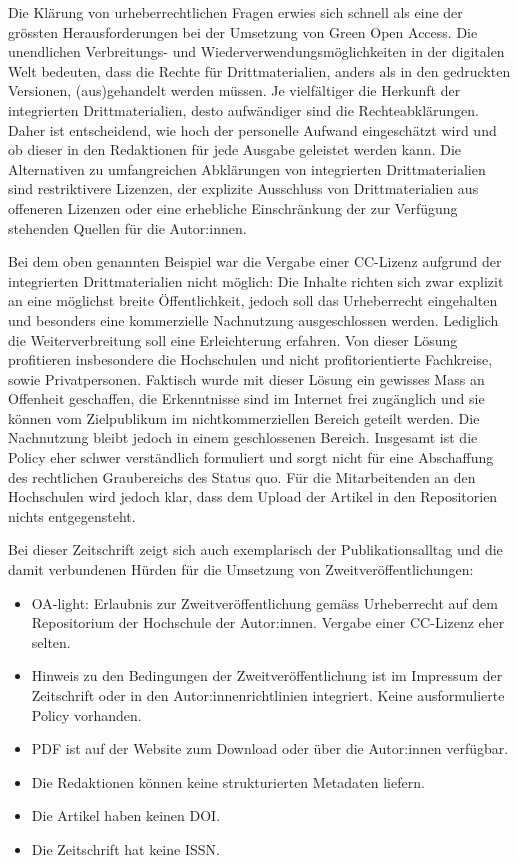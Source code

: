 \documentclass[a4paper,
fontsize=11pt,
oneside,
numbers=noperiodatend,
parskip=half-,
bibliography=totoc,
final
]{scrartcl}
\begin{document}
Die Klärung von urheberrechtlichen Fragen erwies sich schnell als eine
der grössten Herausforderungen bei der Umsetzung von Green Open Access.
Die unendlichen Verbreitungs- und Wiederverwendungsmöglichkeiten in der
digitalen Welt bedeuten, dass die Rechte für Drittmaterialien, anders
als in den gedruckten Versionen, (aus)gehandelt werden müssen. Je
vielfältiger die Herkunft der integrierten Drittmaterialien, desto
aufwändiger sind die Rechteabklärungen. Daher ist entscheidend, wie hoch
der personelle Aufwand eingeschätzt wird und ob dieser in den
Redaktionen für jede Ausgabe geleistet werden kann. Die Alternativen zu
umfangreichen Abklärungen von integrierten Drittmaterialien sind
restriktivere Lizenzen, der explizite Ausschluss von Drittmaterialien
aus offeneren Lizenzen oder eine erhebliche Einschränkung der zur
Verfügung stehenden Quellen für die Autor:innen.

Bei dem oben genannten Beispiel war die Vergabe einer CC-Lizenz aufgrund
der integrierten Drittmaterialien nicht möglich: Die Inhalte richten
sich zwar explizit an eine möglichst breite Öffentlichkeit, jedoch soll
das Urheberrecht eingehalten und besonders eine kommerzielle Nachnutzung
ausgeschlossen werden. Lediglich die Weiterverbreitung soll eine
Erleichterung erfahren. Von dieser Lösung profitieren insbesondere die
Hochschulen und nicht profitorientierte Fachkreise, sowie
Privatpersonen. Faktisch wurde mit dieser Lösung ein gewisses Mass an
Offenheit geschaffen, die Erkenntnisse sind im Internet frei zugänglich
und sie können vom Zielpublikum im nichtkommerziellen Bereich geteilt
werden. Die Nachnutzung bleibt jedoch in einem geschlossenen Bereich.
Insgesamt ist die Policy eher schwer verständlich formuliert und sorgt
nicht für eine Abschaffung des rechtlichen Graubereichs des Status quo.
Für die Mitarbeitenden an den Hochschulen wird jedoch klar, dass dem
Upload der Artikel in den Repositorien nichts entgegensteht.

Bei dieser Zeitschrift zeigt sich auch exemplarisch der
Publikationsalltag und die damit verbundenen Hürden für die Umsetzung
von Zweitveröffentlichungen:

\begin{itemize}
\tightlist
\item
  OA-light: Erlaubnis zur Zweitveröffentlichung gemäss Urheberrecht auf
  dem Repositorium der Hochschule der Autor:innen. Vergabe einer
  CC-Lizenz eher selten.
\item
  Hinweis zu den Bedingungen der Zweitveröffentlichung ist im Impressum
  der Zeitschrift oder in den Autor:innenrichtlinien integriert. Keine
  ausformulierte Policy vorhanden.
\item
  PDF ist auf der Website zum Download oder über die Autor:innen
  verfügbar.
\item
  Die Redaktionen können keine strukturierten Metadaten liefern.
\item
  Die Artikel haben keinen DOI.
\item
  Die Zeitschrift hat keine ISSN.
\end{itemize}
\end{document}
